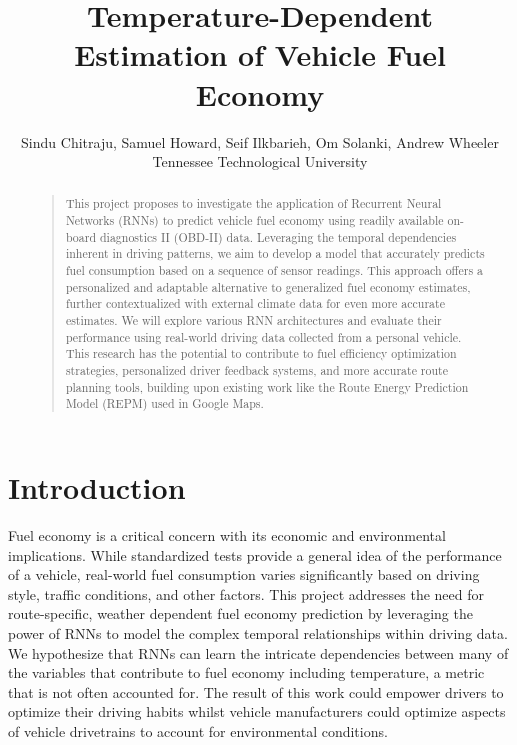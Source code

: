 \documentclass[letterpaper]{article}
\begin{document}

\nocopyright

\title{Temperature-Dependent Estimation of Vehicle Fuel Economy}
\author{Sindu Chitraju, Samuel Howard, Seif Ilkbarieh, Om Solanki, Andrew Wheeler\\
Tennessee Technological University
}

\maketitle

\begin{abstract}
\begin{quote}
    This project proposes to investigate the application of Recurrent Neural Networks (RNNs) to predict vehicle fuel economy using readily available on-board diagnostics II (OBD-II) data. 
    Leveraging the temporal dependencies inherent in driving patterns, we aim to develop a model that accurately predicts fuel consumption based on a sequence of sensor readings. 
    This approach offers a personalized and adaptable alternative to generalized fuel economy estimates, further contextualized with external climate data for even more accurate estimates.
    We will explore various RNN architectures and evaluate their performance using real-world driving data collected from a personal vehicle. 
    This research has the potential to contribute to fuel efficiency optimization strategies, personalized driver feedback systems, and more accurate route planning tools, building upon existing work like the Route Energy Prediction Model (REPM) used in Google Maps. 
\end{quote}
\end{abstract}

\section{Introduction}

\noindent Fuel economy is a critical concern with its economic and environmental implications. 
While standardized tests provide a general idea of the performance of a vehicle, real-world fuel consumption varies significantly based on driving style, traffic conditions, and other factors.
This project addresses the need for route-specific, weather dependent fuel economy prediction by leveraging the power of RNNs to model the complex temporal relationships within driving data.
We hypothesize that RNNs can learn the intricate dependencies between many of the variables that contribute to fuel economy including temperature, a metric that is not often accounted for.
The result of this work could empower drivers to optimize their driving habits whilst vehicle manufacturers could optimize aspects of vehicle drivetrains to account for environmental conditions.
\end{document}
